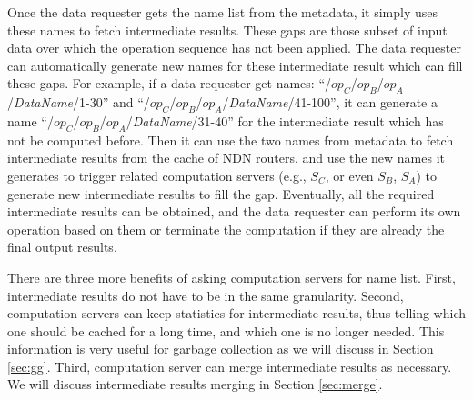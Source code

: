 Once the data requester gets the name list from the metadata, it simply uses these names to fetch intermediate results.
These gaps are those subset of input data over which the operation sequence has not been applied.  
The data requester can automatically generate new names for these intermediate result which can fill these gaps. 
For example, if a data requester get names: ``/$op_C$/$op_B$/$op_A$/{\it DataName}/1-30'' and ``/$op_C$/$op_B$/$op_A$/{\it DataName}/41-100'', it can generate a name ``/$op_C$/$op_B$/$op_A$/{\it DataName}/31-40'' for the intermediate result which has not be computed before.  
Then it can use the two names from metadata to fetch intermediate results from the cache of NDN routers, and use the new names it generates to trigger related computation servers (e.g., $S_C$, or even $S_B$, $S_A$) to generate new intermediate results to fill the gap.  
Eventually, all the required intermediate results can be obtained, and the data requester can perform its own operation based on them or terminate the computation if they are already the final output results.

There are three more benefits of asking computation servers for name list.  
First, intermediate results do not have to be in the same granularity.  
Second, computation servers can keep statistics for intermediate results, thus telling which one should be cached for a long time, and which one is no longer needed. 
This information is very useful for garbage collection as we will discuss in Section \ref{sec:gg}.
Third, computation server can merge intermediate results as necessary. We will discuss intermediate results merging in Section \ref{sec:merge}.
